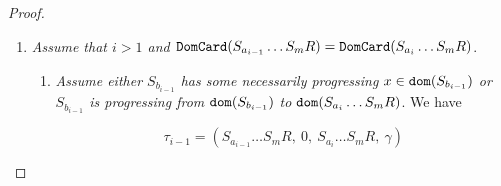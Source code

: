 \documentclass{lmcs}
\begin{document}
\begin{proof}
\begin{enumerate}
\begin{enumerate}
\item
Suppose $i \in [2,h]$. 
Then $\dom(S_{a_i} \ldots S_m  R) \subset \dom(S_{a_i} \ldots S_m )$, 
Thus $(S_{a_i} \ldots S_m R)$ is the last component of $\vec{R},R$ and it is 
made of a single product, therefore $\tau \state \pi_1$. 
From $\dom(S_{a_i} \ldots S_m  R) \subset \dom(S_{a_i} \ldots S_m )$, 
and Lemma \ref{lemma-decreasing-size}.\ref{lemma-decreasing-size-02}
we deduce $\size(S_{a_i} \ldots S_m  R) < \size(S_{a_i} \ldots S_m)$, 
hence $\sigma >\tau$.
\item
Suppose $i=h+1 > 1$. Then $\minStable(\vec{R},R) = S_1, \ldots, S_{b_{h}}, R$.
By assumption from $i=h+1>1$ we deduce$\DomCard(R) \not = 
\DomCard(S_{a_h} \ldots S_m  R)$. 
We obtain 
$
\DomCard(R) 
> 
\DomCard(S_{a_{h}} \ldots S_{b_{h}} R) = 
$ 
(by stability and 
Lemma \ref{lemma-domain-stability}.\ref{lemma-domain-stability-02})  
$ 
\DomCard(S_{a_{h}} \ldots S_{b_{h}})
$. 
Namely $R$ is a one-product 
component of $\vec{R},R$, with a larger domain-cardinality, and $\tau$ 
is the concatenation of $\sigma$ and of $(R,0,R,\alpha_{n+2})$. 
We deduce $\tau \state \pi_1$ and 
$\pi \succ \pi_1$. 
\end{enumerate}


\item
\emph{Assume that $i>1$ and 
${\tt DomCard}(S_{a_{i-1}} \ldots S_{m} R) = {\tt DomCard}(S_{a_i} \ldots S_{m}R)$}. 

\begin{enumerate}

\item
\emph{Assume either $S_{b_{i-1}}$ has some necessarily progressing
$x \in {\tt dom}(S_{b_{i-1}})$ or $S_{b_{i-1}}$ is progressing from ${\tt dom}(S_{b_{i-1}})$ 
to ${\tt dom}(S_{a_i} \ldots S_{m}R)$}. We have

$$
\tau_{i-1} = 
(S_{a_{i-1}} \ldots S_{m} R, \ 0, \ S_{a_{i}} \ldots S_{m} R, \ \gamma)
$$


\end{enumerate}
\end{enumerate}
\end{proof}
\end{document}
